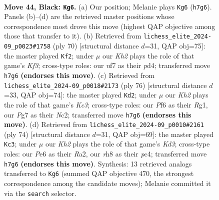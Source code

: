 \documentclass[11pt]{article}
\begin{document}
\clearpage

\begin{figure}[p]\centering
\begin{subfigure}{0.46\textwidth}\centering
\resizebox{\linewidth}{!}{%
\newchessgame
\chessboard[
  setfen={7R/5Npk/4pp2/1p5p/3P1P1P/1r2P1PK/8/8 b - - 9 44},
  showmover=false,
  pgfstyle=straightmove, color=movearrow, markmove={h7-g6}
]}
\caption{}
\end{subfigure}\hfill
\begin{subfigure}{0.46\textwidth}\centering
\resizebox{\linewidth}{!}{%
\newchessgame
\chessboard[
  setfen={8/1p3k2/p1p3p1/2P2pP1/1P1p1P1P/4rK2/8/1R6 w - - 2 36},
  showmover=false,
  pgfstyle=straightmove, color=movearrow, markmove={f3-f2}
]}
\caption{}
\end{subfigure}
\\[4pt]
\begin{subfigure}{0.46\textwidth}\centering
\resizebox{\linewidth}{!}{%
\newchessgame
\chessboard[
  setfen={8/8/6p1/2npkp1p/p6P/1rK1PP2/2N2P2/6R1 w - - 2 39},
  showmover=false,
  pgfstyle=straightmove, color=movearrow, markmove={c3-d2}
]}
\caption{}
\end{subfigure}\hfill
\begin{subfigure}{0.46\textwidth}\centering
\resizebox{\linewidth}{!}{%
\newchessgame
\chessboard[
  setfen={8/2r5/3kp1pp/Pp3p2/1Pp2P2/3KP1PP/R7/8 w - - 0 38},
  showmover=false,
  pgfstyle=straightmove, color=movearrow, markmove={d3-c3}
]}
\caption{}
\end{subfigure}
\caption{\textbf{Move 44, Black: \texttt{Kg6}.} (a) Our position; Melanie plays \texttt{Kg6} (\texttt{h7g6}). Panels (b)--(d) are the retrieved master positions whose correspondence most drove this move (highest QAP objective among those that transfer to it). (b) Retrieved from \texttt{lichess\_elite\_2024-09\_p0023\#1758} (ply 70) [structural distance $d$=31, QAP obj=75]: the master played \texttt{Kf2}; under $\mu$ our \emph{Kh2} plays the role of that game's \emph{Kf3}; cross-type roles: our \emph{n}f7 as their \emph{p}d4; transferred move \texttt{h7g6} \textbf{(endorses this move)}. (c) Retrieved from \texttt{lichess\_elite\_2024-09\_p0018\#2173} (ply 76) [structural distance $d$=33, QAP obj=74]: the master played \texttt{Kd2}; under $\mu$ our \emph{Kh2} plays the role of that game's \emph{Kc3}; cross-type roles: our \emph{P}f6 as their \emph{R}g1, our \emph{P}g7 as their \emph{N}c2; transferred move \texttt{h7g6} \textbf{(endorses this move)}. (d) Retrieved from \texttt{lichess\_elite\_2024-09\_p0010\#2161} (ply 74) [structural distance $d$=31, QAP obj=69]: the master played \texttt{Kc3}; under $\mu$ our \emph{Kh2} plays the role of that game's \emph{Kd3}; cross-type roles: our \emph{P}e6 as their \emph{R}a2, our \emph{r}h8 as their \emph{p}c4; transferred move \texttt{h7g6} \textbf{(endorses this move)}. Synthesis: 13 retrieved analogs transferred to \texttt{Kg6} (summed QAP objective 470, the strongest correspondence among the candidate moves); Melanie committed it via the \texttt{search} selector.}
\label{fig:thought-m87}
\end{figure}
\end{document}
